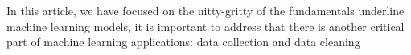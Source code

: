 In this article, we have focused on the nitty-gritty of the fundamentals underline machine learning models, it is important to address that there is another critical part of machine learning applications: data collection and data cleaning 